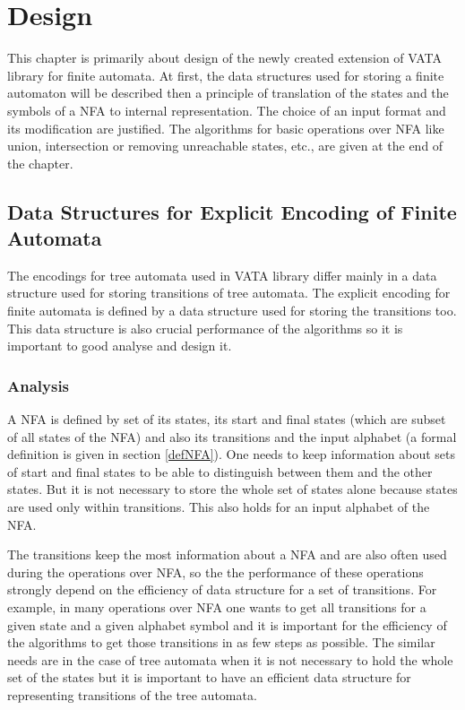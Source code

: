 \chapter{Design}
\label{design}
This chapter is primarily about design of the newly created extension of VATA library for finite automata. 
At first, the data structures used for storing a finite automaton will be described then a principle of translation of the states and the symbols of a NFA 
to internal representation. The choice of an input format and its modification are justified.  
The algorithms for basic operations over NFA like union, intersection or removing unreachable states, etc., are given at the end of the chapter.

\section{Data Structures for Explicit Encoding of Finite Automata}
The encodings for tree automata used in VATA library differ mainly in a data structure used for storing transitions of tree automata. The explicit encoding
for finite automata is defined by a data structure used for storing the transitions too. 
This data structure is also crucial performance of the algorithms so it is important to good analyse and design it. 

\label{data structure explicit}
\subsection{Analysis}
\label{analysis}
A NFA is defined by set of its states, its start and final states (which are subset of all states of the NFA) and also its
transitions and the input alphabet (a formal definition is given in section \ref{defNFA}). 
One needs to keep information about sets of start and final states to be able to distinguish
between them and the other states. But it is not necessary to store the whole set of states alone because states are used only within transitions. 
This also holds for an input alphabet of the NFA. 

The transitions keep the most information about a NFA and are also often used
during the operations over NFA, so the the performance of these operations strongly depend on the efficiency of data structure for a set of transitions. 
For example, in many operations over NFA one wants to get all transitions for a given state and a given alphabet symbol and it is important for 
the efficiency of the algorithms to get those transitions in as few steps as possible. The similar needs are in the case
of tree automata when it is not necessary to hold the whole set of the states but it is important to have an efficient data structure for representing 
transitions of the tree automata.

